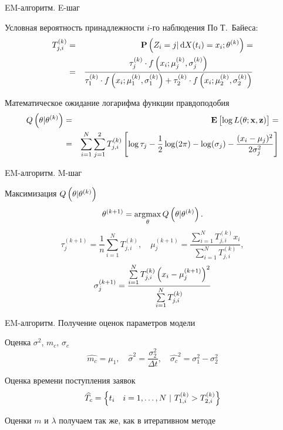 \documentclass[utf8]{beamer}
\DeclareMathOperator*{\argmax}{\arg\!\max}
\begin{document}
\begin{frame}{EM-алгоритм. E-шаг}
\begin{block}{Условная вероятность принадлежности $i$-го наблюдения}
По Т.~Байеса:
\begin{eqnarray*}
  T_{j,i}^{(k)} 
    &=& \mathbf{P}\del{Z_i = j \vert \dif X(t_i) = x_i; \theta^{(k)}} = \\
    &=& 
    \frac{\tau_j^{(k)} \cdot f\del{x_i; \mu_j^{(k)}, \sigma_j^{(k)}}}
         {\tau_1^{(k)} \cdot f\del{x_i; \mu_1^{(k)}, \sigma_1^{(k)}} + 
         {\tau_2^{(k)} \cdot f\del{x_i; \mu_2^{(k)}, \sigma_2^{(k)}}}}
\end{eqnarray*}
\end{block}
\begin{block}{Математическое ожидание логарифма функции правдоподобия}
\begin{eqnarray*}
  Q\del{\theta \vert \theta^{(k)}} 
    &=& 
    \mathbf{E}\sbr{\log L(\theta; \mathbf{x}, \mathbf{z})} = \\
    &=& \sum\limits_{i=1}^{N} \sum\limits_{j=1}^2
      T_{j,i}^{(k)} 
        \sbr{
          \log \tau_j - 
          \frac{1}{2}\log(2\pi) -
          \log(\sigma_j) -
          \frac{(x_i - \mu_j)^2}{2 \sigma_j^2}
        }
\end{eqnarray*}
\end{block}
\end{frame}


\begin{frame}{EM-алгоритм. M-шаг}
\begin{block}{Максимизация $Q\del{\theta \vert \theta^{(k)}}$}
$$
\theta^{(k+1)} = \argmax\limits_{\theta} Q\del{\theta \vert \theta^{(k)}}.
$$
$$
\tau_j^{(k+1)} = \frac{1}{n} \sum\limits_{i=1}^{N} T_{j,i}^{(k)},\quad
\mu_j^{(k+1)} = \frac
  {\sum\limits_{i=1}^{N} T_{j,i}^{(k)} x_i}
  {\sum\limits_{i=1}^{N} T_{j,i}^{(k)}},
$$
$$
\sigma_j^{(k+1)} = \frac
  {\sum\limits_{i=1}^{N} T_{j,i}^{(k)} \del{x_i - \mu_j^{(k+1)}}^2}
  {\sum\limits_{i=1}^{N} T_{j,i}^{(k)}}
$$
\end{block}
\end{frame}


\begin{frame}{EM-алгоритм. Получение оценок параметров модели}
\begin{block}{Оценка $\sigma^2$, $m_c$, $\sigma_c$}
$$
  \widehat{m_c} = \mu_1, \quad 
  \widehat{\sigma}^2 = \frac{\sigma_2^2}{\Delta t}, \quad
  \widehat{\sigma_c}^2 = \sigma_1^2 - \sigma_2^2
$$
\end{block}
\begin{block}{Оценка времени поступления заявок}
$$\widehat{T_c} = \cbr{t_i \quad i=1,\ldots,N\ \vert\ 
    T_{1,i}^{(k)} > T_{2,i}^{(k)}}$$
\end{block}

Оценки $m$ и $\lambda$ получаем так же, как в итеративном методе
\end{frame}
\end{document}
